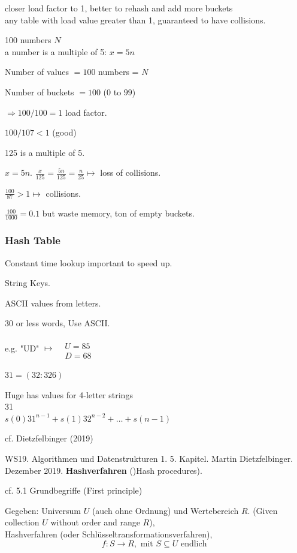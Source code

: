 \documentclass[10pt]{amsart}
\begin{document}
closer load factor to 1, better to rehash and add more buckets \\
any table with load value greater than 1, guaranteed to have collisions.

100 numbers $N$ \\
a number is a multiple of 5: $x = 5n$ 

Number of values $= 100$ numbers = $N$

Number of buckets $= 100$ ($0$ to $99$)

$\Longrightarrow 100/ 100 = 1$ load factor.

$100/107 < 1$ (good)

125 is a multiple of 5.

$x=5n$. $\frac{x}{125} = \frac{5n}{125} = \frac{n}{25} \mapsto $ loss of collisions.

$\frac{100}{87} > 1 \mapsto$ collisions.

$\frac{100}{1000} = 0.1$ but waste memory, ton of empty buckets.

\subsubsection{Hash Table}

Constant time lookup important to speed up.

String Keys.

ASCII values from letters.

30 or less words, Use ASCII. 

e.g. "UD" $\mapsto \begin{aligned} & \quad \\
	& U = 85 \\
	& D = 68 \end{aligned}$ 

$31 = (32 : 326)$ 

Huge has values for 4-letter strings \\
31 \\
$s(0) 31^{n-1} + s(1) 32^{n-2} + \dots + s(n-1)$

cf. Dietzfelbinger (2019) \cite{Diet2019}

WS19. Algorithmen und Datenstrukturen 1. 5. Kapitel. Martin Dietzfelbinger. Dezember 2019. \textbf{Hashverfahren} ()Hash procedures).

cf. 5.1 Grundbegriffe (First principle) \cite{Diet2019}

Gegeben: Universum $U$ (auch ohne Ordnung) und Wertebereich $R$. (Given collection $U$ without order and range $R$), \\
Hashverfahren (oder Schl\"{u}sseltransformationsverfahren),
\begin{equation}
f:S \to R, \text{ mit } S \subseteq U \text{ endlich }
\end{equation}
\end{document}
